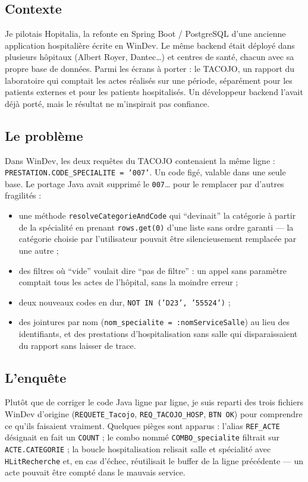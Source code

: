 \documentclass[10pt,twoside,openany]{article}
\begin{document}
\subsection*{Contexte}
Je pilotais Hopitalia, la refonte en Spring Boot / PostgreSQL d'une ancienne application hospitalière écrite en WinDev. Le même backend était déployé dans plusieurs hôpitaux (Albert Royer, Dantec\dots) et centres de santé, chacun avec sa propre base de données. Parmi les écrans à porter : le TACOJO, un rapport du laboratoire qui comptait les actes réalisés sur une période, séparément pour les patients externes et pour les patients hospitalisés. Un développeur backend l'avait déjà porté, mais le résultat ne m'inspirait pas confiance.

\subsection*{Le problème}
Dans WinDev, les deux requêtes du TACOJO contenaient la même ligne : \texttt{PRESTATION.CODE\_SPECIALITE = '007'}. Un code figé, valable dans une seule base. Le portage Java avait supprimé le \texttt{007}\dots{} pour le remplacer par d'autres fragilités :
\begin{itemize}
  \item une méthode \texttt{resolveCategorieAndCode} qui \enquote{devinait} la catégorie à partir de la spécialité en prenant \texttt{rows.get(0)} d'une liste sans ordre garanti --- la catégorie choisie par l'utilisateur pouvait être silencieusement remplacée par une autre ;
  \item des filtres où \enquote{vide} voulait dire \enquote{pas de filtre} : un appel sans paramètre comptait tous les actes de l'hôpital, sans la moindre erreur ;
  \item deux nouveaux codes en dur, \texttt{NOT IN ('D23', '55524')} ;
  \item des jointures par nom (\texttt{nom\_specialite = :nomServiceSalle}) au lieu des identifiants, et des prestations d'hospitalisation sans salle qui disparaissaient du rapport sans laisser de trace.
\end{itemize}

\subsection*{L'enquête}
Plutôt que de corriger le code Java ligne par ligne, je suis reparti des trois fichiers WinDev d'origine (\texttt{REQUETE\_Tacojo}, \texttt{REQ\_TACOJO\_HOSP}, \texttt{BTN OK}) pour comprendre ce qu'ils faisaient vraiment. Quelques pièges sont apparus : l'alias \texttt{REF\_ACTE} désignait en fait un \texttt{COUNT} ; le combo nommé \texttt{COMBO\_specialite} filtrait sur \texttt{ACTE.CATEGORIE} ; la boucle hospitalisation relisait salle et spécialité avec \texttt{HLitRecherche} et, en cas d'échec, réutilisait le buffer de la ligne précédente --- un acte pouvait être compté dans le mauvais service.
\end{document}
